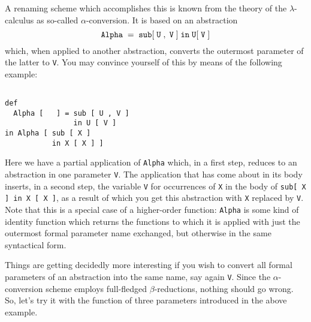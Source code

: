 A renaming scheme which accomplishes this is known from the theory
of the $\lambda$-calculus as so-called {\mys $\alpha$-conversion}. It is
based on an abstraction
$$
{\tt Alpha\;=\;sub[\;U\;,\;V\;]\;in\;U[\;V\;]}  
$$
which, when applied to another abstraction, converts the outermost parameter
of the latter to {\tt V}. You may convince yourself of this by means
of the following example:
\begin{verbatim}

def 
  Alpha [   ] = sub [ U , V ]
                in U [ V ]
in Alpha [ sub [ X ]
           in X [ X ] ]

\end{verbatim}
Here we have a {\mys partial application} of {\tt Alpha} which, in a first step,
reduces to an abstraction in one parameter {\tt V}. The application that has
come about in its body inserts, in a second step, the variable {\tt V}
for occurrences of {\tt X} in the body of {\tt sub[ X ] in X [ X ]},
as a result of which you get this abstraction with {\tt X} replaced
by {\tt V}. Note that this is a special case of  a higher-order function: {\tt Alpha} is some kind of {\mys identity function} which returns the
functions to which it is applied with just the outermost 
formal parameter name 
exchanged, but otherwise in the same syntactical form. 

Things are getting decidedly more interesting if you wish to convert
all formal parameters of an abstraction into the same name, say 
again {\tt V}. Since the $\alpha$-conversion scheme employs full-fledged
$\beta$-reductions, nothing should go wrong. So, let's try
it with the function of three parameters introduced in the
above example.

